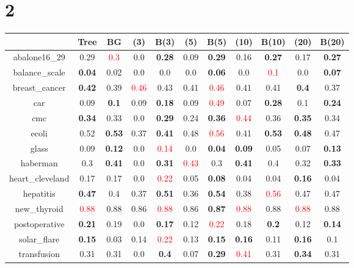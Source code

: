 \documentclass{article}%
\begin{document}
\section*{2}%
\begin{tabular}{c|cccccccccc}%
\hline%
&Tree&BG&(3)&B(3)&(5)&B(5)&(10)&B(10)&(20)&B(20)\\%
\hline%
abalone16\_29&0.29&\textcolor{red}{ 
0.3
}&0.0&\textbf{0.28}&0.09&\textbf{0.29}&0.16&\textbf{0.27}&0.17&\textbf{0.27}\\%
\hline%
balance\_scale&\textbf{0.04}&0.02&0.0&0.0&0.0&\textbf{0.06}&0.0&\textcolor{red}{ 
0.1
}&0.0&\textbf{0.07}\\%
\hline%
breast\_cancer&\textbf{0.42}&0.39&\textcolor{red}{ 
0.46
}&0.43&0.41&\textcolor{red}{ 
0.46
}&0.41&0.41&\textbf{0.4}&0.37\\%
\hline%
car&0.09&\textbf{0.1}&0.09&\textbf{0.18}&0.09&\textcolor{red}{ 
0.49
}&0.07&\textbf{0.28}&0.1&\textbf{0.24}\\%
\hline%
cmc&\textbf{0.34}&0.33&0.0&\textbf{0.29}&0.24&\textbf{0.36}&\textcolor{red}{ 
0.44
}&0.36&\textbf{0.35}&0.34\\%
\hline%
ecoli&0.52&\textbf{0.53}&0.37&\textbf{0.41}&0.48&\textcolor{red}{ 
0.56
}&0.41&\textbf{0.53}&\textbf{0.48}&0.47\\%
\hline%
glass&0.09&\textbf{0.12}&0.0&\textcolor{red}{ 
0.14
}&0.0&\textbf{0.04}&\textbf{0.09}&0.05&0.07&\textbf{0.13}\\%
\hline%
haberman&0.3&\textbf{0.41}&0.0&\textbf{0.31}&\textcolor{red}{ 
0.43
}&0.3&\textbf{0.41}&0.4&0.32&\textbf{0.33}\\%
\hline%
heart\_cleveland&0.17&0.17&0.0&\textcolor{red}{ 
0.22
}&0.05&\textbf{0.08}&0.04&0.04&\textbf{0.16}&0.04\\%
\hline%
hepatitis&\textbf{0.47}&0.4&0.37&\textbf{0.51}&0.36&\textbf{0.54}&0.38&\textcolor{red}{ 
0.56
}&0.47&0.47\\%
\hline%
new\_thyroid&\textcolor{red}{ 
0.88
}&0.88&0.86&\textcolor{red}{ 
0.88
}&0.86&\textbf{0.87}&\textcolor{red}{ 
0.88
}&0.88&\textcolor{red}{ 
0.88
}&0.88\\%
\hline%
postoperative&\textbf{0.21}&0.19&0.0&\textbf{0.17}&0.12&\textcolor{red}{ 
0.22
}&0.18&\textbf{0.2}&0.12&\textbf{0.14}\\%
\hline%
solar\_flare&\textbf{0.15}&0.03&0.14&\textcolor{red}{ 
0.22
}&0.13&\textbf{0.15}&\textbf{0.16}&0.11&\textbf{0.16}&0.1\\%
\hline%
transfusion&0.31&0.31&0.0&\textbf{0.4}&0.07&\textbf{0.29}&\textcolor{red}{ 
0.41
}&0.31&\textbf{0.34}&0.31\\%

\end{tabular}
\end{document}
